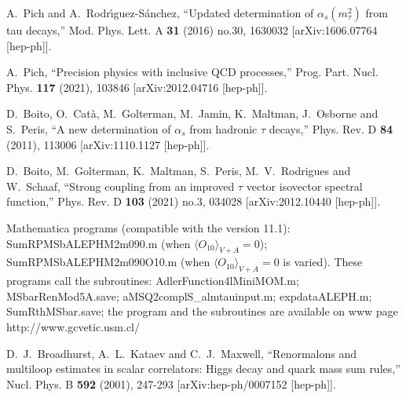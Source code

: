 \documentclass[aps,nofootinbib,showkeys,noshowpacs,preprintnumbers,amsmath,amssymb]{revtex4}
\begin{document}
\begin{thebibliography}{99}
A.~Pich and A.~Rodr\'\i{}guez-S\'anchez,
``Updated determination of $\alpha_s(m_\tau^2)$ from tau decays,''
Mod. Phys. Lett. A \textbf{31} (2016) no.30, 1630032
[arXiv:1606.07764 [hep-ph]].

A.~Pich,
``Precision physics with inclusive QCD processes,''
Prog. Part. Nucl. Phys. \textbf{117} (2021), 103846
[arXiv:2012.04716 [hep-ph]].

  
D.~Boito, O.~Cat\`a, M.~Golterman, M.~Jamin, K.~Maltman, J.~Osborne and S.~Peris,
``A new determination of $\alpha_s$ from hadronic $\tau$ decays,''
Phys. Rev. D \textbf{84} (2011), 113006
[arXiv:1110.1127 [hep-ph]].




D.~Boito, M.~Golterman, K.~Maltman, S.~Peris, M.~V.~Rodrigues and W.~Schaaf,
``Strong coupling from an improved $\tau$ vector isovector spectral function,''
Phys. Rev. D \textbf{103} (2021) no.3, 034028
[arXiv:2012.10440 [hep-ph]].  


Mathematica programs (compatible with the version 11.1):
SumRPMSbALEPHM2m090.m (when $\langle O_{10} \rangle_{V+A}=0$);
SumRPMSbALEPHM2m090O10.m (when $\langle O_{10} \rangle_{V+A}=0$ is varied).
These programs call the subroutines: AdlerFunction4lMiniMOM.m; MSbarRenMod5A.save; aMSQ2complS\_almtauinput.m; expdataALEPH.m; SumRthMSbar.save; the program and the subroutines are available on www page http://www.gcvetic.usm.cl/ 

D.~J.~Broadhurst, A.~L.~Kataev and C.~J.~Maxwell,
``Renormalons and multiloop estimates in scalar correlators: Higgs decay and quark mass sum rules,''
Nucl. Phys. B \textbf{592} (2001), 247-293
[arXiv:hep-ph/0007152 [hep-ph]].
  
\end{thebibliography}

\end{document}
